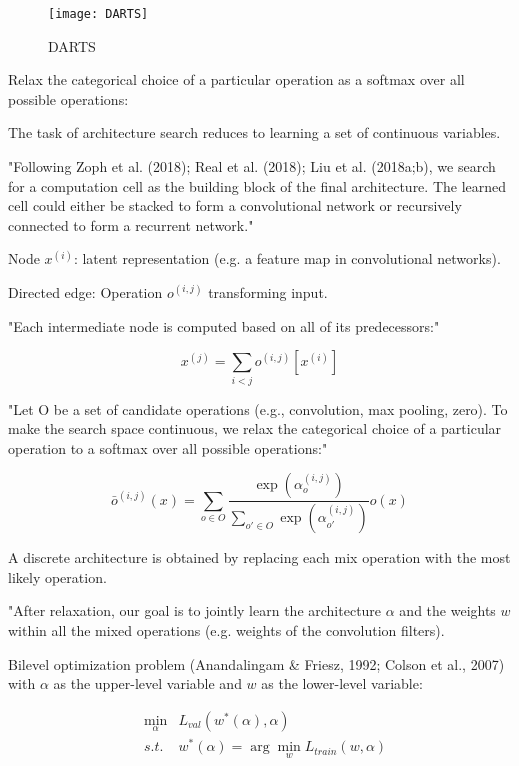 \documentclass[english]{article}
\begin{document}
\begin{figure}[h!]
  \centering
  \texttt{[image: DARTS]}
  \caption{DARTS}
  \label{darts}
\end{figure}


Relax the categorical choice of a particular operation as a softmax over all possible operations:

\benum 
\item 
The task of architecture search reduces to learning a set of continuous variables.

"Following Zoph et al. (2018); Real et al. (2018); Liu et al. (2018a;b), we search for a computation
cell as the building block of the final architecture. The learned cell could either be stacked to form a
convolutional network or recursively connected to form a recurrent network."

Node $x^{(i)}$: latent representation (e.g. a feature map in convolutional networks).

Directed edge:  Operation $o^{(i,j)}$ transforming input.

"Each intermediate node is computed based on all of its predecessors:"

$$x^{(j)} = \sum_{i<j} o^{(i,j)}[x^{(i)}]$$


"Let O be a set of candidate operations (e.g., convolution, max pooling, zero). To make the search space continuous, we relax
the categorical choice of a particular operation to a softmax over all possible operations:"

$$\bar o^{(i,j)}(x) = \sum_{o\in O} 
\frac{\exp(\alpha_o^{(i,j)})}
{\sum_{o'\in O}\exp(\alpha_{o'}^{(i,j)})}
o(x)$$




\item 
A discrete architecture is obtained by replacing each mix operation  with the most likely operation. 


\item "After relaxation, our goal is to jointly learn the architecture $\alpha$ and the weights $w$ within all the mixed
operations (e.g. weights of the convolution filters).

\item Bilevel optimization problem (Anandalingam \& Friesz, 1992; Colson et al., 2007) with $\alpha$ as the upper-level variable and $w$ as the lower-level variable:

\begin{align*}
&\min_\alpha &L_{val}(w^*(\alpha),\alpha)\\
&s.t. & w^*(\alpha) = \arg\min_w L_{train} (w,\alpha)
\end{align*} 
\end{document}
